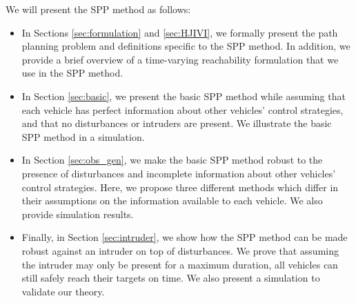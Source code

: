 We will present the SPP method as follows:
\begin{itemize}
\item In Sections \ref{sec:formulation} and \ref{sec:HJIVI}, we formally present the path planning problem and definitions specific to the SPP method. In addition, we provide a brief overview of a time-varying reachability formulation that we use in the SPP method.
\item In Section \ref{sec:basic}, we present the basic SPP method while assuming that each vehicle has perfect information about other vehicles' control strategies, and that no disturbances or intruders are present. We illustrate the basic SPP method in a simulation.
\item In Section \ref{sec:obs_gen}, we make the basic SPP method robust to the presence of disturbances and incomplete information about other vehicles' control strategies. Here, we propose three different methods which differ in their assumptions on the information available to each vehicle. We also provide simulation results.
\item Finally, in Section \ref{sec:intruder}, we show how the SPP method can be made robust against an intruder on top of disturbances. We prove that assuming the intruder may only be present for a maximum duration, all vehicles can still safely reach their targets on time. We also present a simulation to validate our theory.
\end{itemize}

